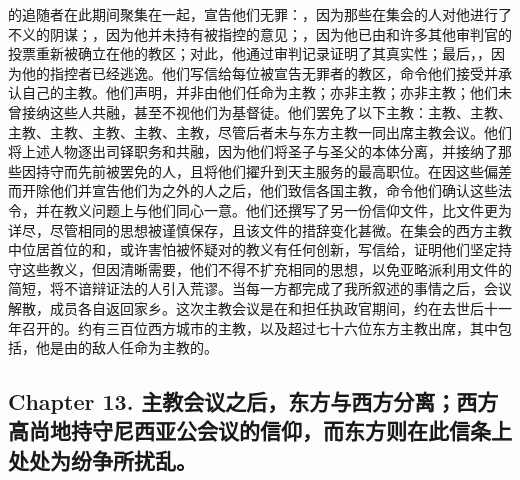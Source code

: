 的追随者在此期间聚集在一起，宣告他们无罪：，因为那些在集会的人对他进行了不义的阴谋；，因为他并未持有被指控的意见；，因为他已由和许多其他审判官的投票重新被确立在他的教区；对此，他通过审判记录证明了其真实性；最后，，因为他的指控者已经逃逸。他们写信给每位被宣告无罪者的教区，命令他们接受并承认自己的主教。他们声明，并非由他们任命为主教；亦非主教；亦非主教；他们未曾接纳这些人共融，甚至不视他们为基督徒。他们罢免了以下主教：主教、主教、主教、主教、主教、主教、主教，尽管后者未与东方主教一同出席主教会议。他们将上述人物逐出司铎职务和共融，因为他们将圣子与圣父的本体分离，并接纳了那些因持守而先前被罢免的人，且将他们擢升到天主服务的最高职位。在因这些偏差而开除他们并宣告他们为之外的人之后，他们致信各国主教，命令他们确认这些法令，并在教义问题上与他们同心一意。他们还撰写了另一份信仰文件，比文件更为详尽，尽管相同的思想被谨慎保存，且该文件的措辞变化甚微。在集会的西方主教中位居首位的和，或许害怕被怀疑对的教义有任何创新，写信给，证明他们坚定持守这些教义，但因清晰需要，他们不得不扩充相同的思想，以免亚略派利用文件的简短，将不谙辩证法的人引入荒谬。当每一方都完成了我所叙述的事情之后，会议解散，成员各自返回家乡。这次主教会议是在和担任执政官期间，约在去世后十一年召开的。约有三百位西方城市的主教，以及超过七十六位东方主教出席，其中包括，他是由的敌人任命为主教的。\par


\subsection{Chapter 13. 主教会议之后，东方与西方分离；西方高尚地持守尼西亚公会议的信仰，而东方则在此信条上处处为纷争所扰乱。}

